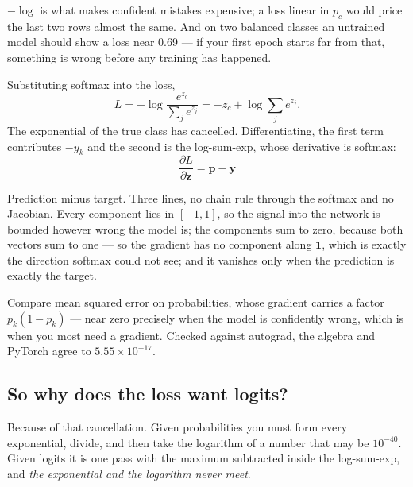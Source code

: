 \documentclass[11pt,a4paper]{article}
\begin{document}
$-\log$ is what makes confident mistakes expensive; a loss linear in $p_c$
would price the last two rows almost the same. And on two balanced classes an
untrained model should show a loss near 0.69 --- if your first epoch starts far
from that, something is wrong before any training has happened.

\begin{derivbox}[title={The gradient with respect to the logits}]
Substituting softmax into the loss,
\[ L = -\log\frac{e^{z_c}}{\sum_j e^{z_j}} = -z_c + \log\sum_j e^{z_j}. \]
The exponential of the true class has cancelled. Differentiating, the first
term contributes $-y_k$ and the second is the log-sum-exp, whose derivative is
softmax:
\[ \boxed{\;\frac{\partial L}{\partial\mathbf{z}} = \mathbf{p} - \mathbf{y}\;} \]
\end{derivbox}

Prediction minus target. Three lines, no chain rule through the softmax and no
Jacobian. Every component lies in $[-1,1]$, so the signal into the network is
bounded however wrong the model is; the components sum to zero, because both
vectors sum to one --- so the gradient has no component along $\mathbf{1}$,
which is exactly the direction softmax could not see; and it vanishes only when
the prediction is exactly the target.

Compare mean squared error on probabilities, whose gradient carries a factor
$p_k(1-p_k)$ --- near zero precisely when the model is confidently wrong, which
is when you most need a gradient. Checked against autograd, the algebra and
PyTorch agree to $5.55\times10^{-17}$.

\subsection{So why does the loss want logits?}

Because of that cancellation. Given probabilities you must form every
exponential, divide, and then take the logarithm of a number that may be
$10^{-40}$. Given logits it is one pass with the maximum subtracted inside the
log-sum-exp, and \emph{the exponential and the logarithm never meet}.
\end{document}

